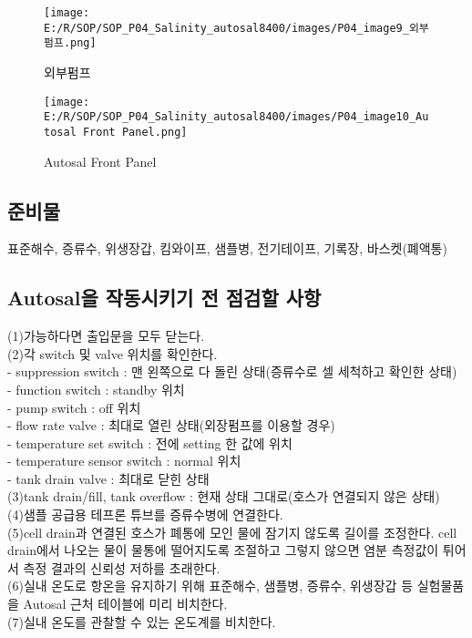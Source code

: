 \documentclass[
]{book}
\begin{document}
\begin{figure}
\centering
\texttt{[image: E:/R/SOP/SOP\_P04\_Salinity\_autosal8400/images/P04\_image9\_외부펌프.png]}
\caption{외부펌프}
\end{figure}

\begin{figure}
\centering
\texttt{[image: E:/R/SOP/SOP\_P04\_Salinity\_autosal8400/images/P04\_image10\_Autosal Front Panel.png]}
\caption{Autosal Front Panel}
\end{figure}

\hypertarget{uxc900uxbe44uxbb3c}{%
\subsection{준비물}\label{uxc900uxbe44uxbb3c}}

표준해수, 증류수, 위생장갑, 킴와이프, 샘플병, 전기테이프, 기록장, 바스켓(폐액통)

\hypertarget{autosaluxc744-uxc791uxb3d9uxc2dcuxd0a4uxae30-uxc804-uxc810uxac80uxd560-uxc0acuxd56d}{%
\subsection{Autosal을 작동시키기 전 점검할 사항}\label{autosaluxc744-uxc791uxb3d9uxc2dcuxd0a4uxae30-uxc804-uxc810uxac80uxd560-uxc0acuxd56d}}

(1)가능하다면 출입문을 모두 닫는다.\\
(2)각 switch 및 valve 위치를 확인한다.\\
- suppression switch : 맨 왼쪽으로 다 돌린 상태(증류수로 셀 세척하고 확인한 상태)\\
- function switch : standby 위치\\
- pump switch : off 위치\\
- flow rate valve : 최대로 열린 상태(외장펌프를 이용할 경우)\\
- temperature set switch : 전에 setting 한 값에 위치\\
- temperature sensor switch : normal 위치\\
- tank drain valve : 최대로 닫힌 상태\\
(3)tank drain/fill, tank overflow : 현재 상태 그대로(호스가 연결되지 않은 상태)\\
(4)샘플 공급용 테프론 튜브를 증류수병에 연결한다.\\
(5)cell drain과 연결된 호스가 폐통에 모인 물에 잠기지 않도록 길이를 조정한다. cell drain에서 나오는 물이 물통에 떨어지도록 조절하고 그렇지 않으면 염분 측정값이 튀어서 측정 결과의 신뢰성 저하를 초래한다.\\
(6)실내 온도로 항온을 유지하기 위해 표준해수, 샘플병, 증류수, 위생장갑 등 실험물품을 Autosal 근처 테이블에 미리 비치한다.\\
(7)실내 온도를 관찰할 수 있는 온도계를 비치한다.
\end{document}
